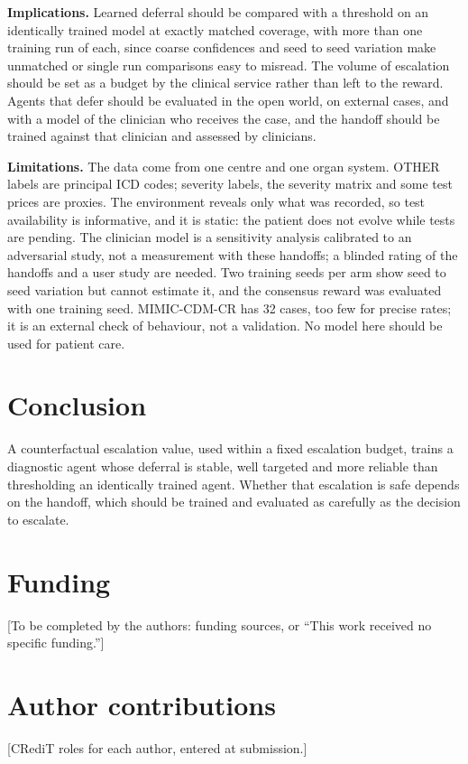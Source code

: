 \documentclass[11pt]{article}
\begin{document}
\textbf{Implications.} Learned deferral should be compared with a threshold on an identically trained model at exactly matched coverage, with more than one training run of each, since coarse confidences and seed to seed variation make unmatched or single run comparisons easy to misread. The volume of escalation should be set as a budget by the clinical service rather than left to the reward. Agents that defer should be evaluated in the open world, on external cases, and with a model of the clinician who receives the case, and the handoff should be trained against that clinician and assessed by clinicians.

\textbf{Limitations.} The data come from one centre and one organ system. OTHER labels are principal ICD codes; severity labels, the severity matrix and some test prices are proxies. The environment reveals only what was recorded, so test availability is informative, and it is static: the patient does not evolve while tests are pending. The clinician model is a sensitivity analysis calibrated to an adversarial study, not a measurement with these handoffs; a blinded rating of the handoffs and a user study are needed. Two training seeds per arm show seed to seed variation but cannot estimate it, and the consensus reward was evaluated with one training seed. MIMIC-CDM-CR has 32 cases, too few for precise rates; it is an external check of behaviour, not a validation. No model here should be used for patient care.

\section*{Conclusion}
A counterfactual escalation value, used within a fixed escalation budget, trains a diagnostic agent whose deferral is stable, well targeted and more reliable than thresholding an identically trained agent. Whether that escalation is safe depends on the handoff, which should be trained and evaluated as carefully as the decision to escalate.

\section*{Funding}
[To be completed by the authors: funding sources, or ``This work received no specific funding.'']

\section*{Author contributions}
[CRediT roles for each author, entered at submission.]
\end{document}
